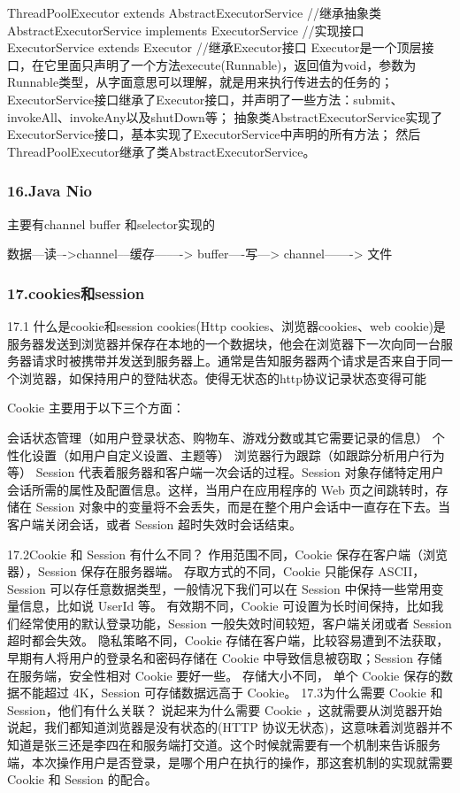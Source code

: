 \documentclass[UTF8]{ctexart}
\begin{document}
ThreadPoolExecutor extends AbstractExecutorService //继承抽象类
AbstractExecutorService implements ExecutorService //实现接口
ExecutorService extends Executor  //继承Executor接口
Executor是一个顶层接口，在它里面只声明了一个方法execute(Runnable)，返回值为void，参数为Runnable类型，从字面意思可以理解，就是用来执行传进去的任务的；
ExecutorService接口继承了Executor接口，并声明了一些方法：submit、invokeAll、invokeAny以及shutDown等；
抽象类AbstractExecutorService实现了ExecutorService接口，基本实现了ExecutorService中声明的所有方法；
然后ThreadPoolExecutor继承了类AbstractExecutorService。
\subsubsection{16.Java Nio}
  主要有channel buffer 和selector实现的

数据––读–->channel––缓存—––-> buffer----写---> channel––––-> 文件

\subsubsection{17.cookies和session}
17.1 什么是cookie和session
cookies(Http cookies、浏览器cookies、web cookie)是服务器发送到浏览器并保存在本地的一个数据块，他会在浏览器下一次向同一台服务器请求时被携带并发送到服务器上。通常是告知服务器两个请求是否来自于同一个浏览器，如保持用户的登陆状态。使得无状态的http协议记录状态变得可能

Cookie 主要用于以下三个方面：

会话状态管理（如用户登录状态、购物车、游戏分数或其它需要记录的信息）
个性化设置（如用户自定义设置、主题等）
浏览器行为跟踪（如跟踪分析用户行为等）
Session 代表着服务器和客户端一次会话的过程。Session 对象存储特定用户会话所需的属性及配置信息。这样，当用户在应用程序的 Web 页之间跳转时，存储在 Session 对象中的变量将不会丢失，而是在整个用户会话中一直存在下去。当客户端关闭会话，或者 Session 超时失效时会话结束。

17.2Cookie 和 Session 有什么不同？
作用范围不同，Cookie 保存在客户端（浏览器），Session 保存在服务器端。
存取方式的不同，Cookie 只能保存 ASCII，Session 可以存任意数据类型，一般情况下我们可以在 Session 中保持一些常用变量信息，比如说 UserId 等。
有效期不同，Cookie 可设置为长时间保持，比如我们经常使用的默认登录功能，Session 一般失效时间较短，客户端关闭或者 Session 超时都会失效。
隐私策略不同，Cookie 存储在客户端，比较容易遭到不法获取，早期有人将用户的登录名和密码存储在 Cookie 中导致信息被窃取；Session 存储在服务端，安全性相对 Cookie 要好一些。
存储大小不同， 单个 Cookie 保存的数据不能超过 4K，Session 可存储数据远高于 Cookie。
17.3为什么需要 Cookie 和 Session，他们有什么关联？
说起来为什么需要 Cookie ，这就需要从浏览器开始说起，我们都知道浏览器是没有状态的(HTTP 协议无状态)，这意味着浏览器并不知道是张三还是李四在和服务端打交道。这个时候就需要有一个机制来告诉服务端，本次操作用户是否登录，是哪个用户在执行的操作，那这套机制的实现就需要 Cookie 和 Session 的配合。
\end{document}
